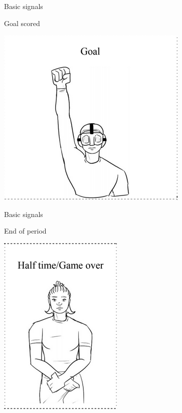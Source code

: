 \documentclass{beamer}
\begin{document}
	\begin{frame}{Basic signals}
		\begin{center}
			Goal scored

			\vspace{0.5cm}

			\includegraphics[scale=1.5]{goalScoredSignal}
		\end{center}
	\end{frame}

	\begin{frame}{Basic signals}
		\begin{center}
			End of period

			\vspace{0.5cm}

			\includegraphics[scale=1.5]{endOfPeriodSignal}
		\end{center}
	\end{frame}
\end{document}
